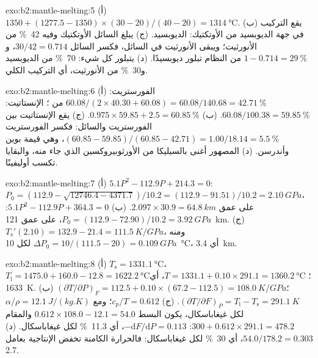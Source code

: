 \begin{solution}{exo:b2:mantle-melting:5}
(أ) $1350 + (1277.5 - 1350)\times(30 - 20)/(40 - 20) = \qty{1314}{\celsius}$.
(ب) يقع التركيب في جهة الديوبسيد من الأوتكتيك: الديوبسيد.
(ج) يبلغ السائل الأوتكتيك وفيه \qty{42}{\percent} من الأنورثيت؛ ويبقى الأنورثيت
في السائل، فكسر السائل $30/42 = 0.714$، و$1 - 0.714 =
\qty{29}{\percent}$ من النظام تبلور ديوبسيدًا. (د) يتبلور
كل شيء: \qty{70}{\percent} من الديوبسيد و\qty{30}{\percent} من الأنورثيت، أي
التركيب الكلي.
\end{solution}

\begin{solution}{exo:b2:mantle-melting:6}
(أ) الفورستريت: $60.08/(2\times40.30 + 60.08) = 60.08/140.68 =
\qty{42.71}{\percent}$ من ؛ الإنستاتيت: $60.08/100.38 = \qty{59.85}{\percent}$.
(ب) $0.975\times59.85 + 2.5 = \qty{60.85}{\percent}$. (ج) يقع الإنستاتيت بين
الفورستريت والسائل: فكسر الفورستريت $(60.85 - 59.85)/(60.85 -
42.71) = 1.00/18.14 = \qty{5.5}{\percent}$، وهي قيمة بوين وأندرسن. (د)
المصهور أغنى بالسيليكا من الأورثوبيروكسين الذي جاء منه،
والبقايا تكسب أوليفينًا.
\end{solution}

\begin{solution}{exo:b2:mantle-melting:7}
(أ) $5.1P^2 - 112.9P + 214.3 = 0$: $P_0 = (112.9 - \sqrt{12746.4 -
4371.7})/10.2 = (112.9 - 91.51)/10.2 = \qty{2.10}{GPa}$، على عمق $2.097\times30.9 =
\qty{64.8}{km}$. (ب) $5.1P^2 - 112.9P + 364.3 = 0$: $P_0 = (112.9 -
72.90)/10.2 = \qty{3.92}{GPa}$، على عمق \qty{121}{km}. (ج) $T_{\mathrm s}'(2.10) = 132.9
- 21.4 = \qty{111.5}{K/GPa}$، ومنه $\Delta P_0 = 10/(111.5 - 20) = \qty{0.109}{GPa}$
لكل \qty{10}{\celsius}، أي \qty{3.4}{km}.
\end{solution}

\begin{solution}{exo:b2:mantle-melting:8}
(أ) $T_{\mathrm s} = \qty{1331.1}{\celsius}$، $T_{\mathrm l} = 1475.0 + 160.0 -
12.8 = \qty{1622.2}{\celsius}$؛ $T = 1331.1 + 0.10\times291.1 =
\qty{1360.2}{\celsius}$، أي \qty{1633}{K}. (ب) $(\partial T/\partial P)_F = 112.5
+ 0.10\times(67.2 - 112.5) = \qty{108.0}{K/GPa}$؛ $(\partial T/\partial F)_P =
T_{\mathrm l} - T_{\mathrm s} = \qty{291.1}{K}$. (ج) $c_p/T = 0.612$؛ ومع $\alpha/\rho
= \qty{12.1}{J/(kg.K)}$ لكل غيغاباسكال، يكون البسط $0.612\times108.0 - 12.1
= 54.0$ والمقام $300 + 0.612\times291.1 = 478.2$: $-\mathrm dF/\mathrm
dP = 0.113$، أي \qty{11.3}{\percent} لكل غيغاباسكال. (د) $54.0/178.2 = 0.303$،
أي \qty{30}{\percent} لكل غيغاباسكال: فالحرارة الكامنة تخفض الإنتاجية بعامل
2.7.
\end{solution}

